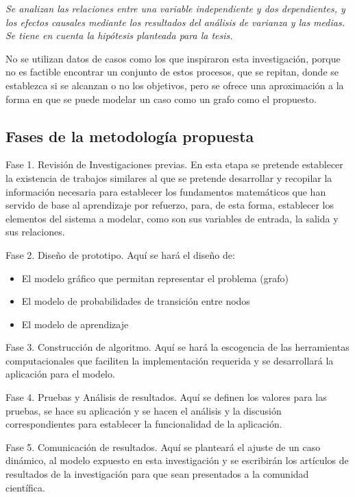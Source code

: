 \textit{Se analizan las relaciones entre una variable independiente y dos dependientes, y los efectos causales mediante los resultados del análisis de varianza y las medias. Se tiene en cuenta la hipótesis planteada para la tesis.}

No se utilizan datos de casos como los que inspiraron esta investigación, porque no es factible encontrar un conjunto de estos procesos, que se repitan, donde se establezca si se alcanzan o no los objetivos, pero se ofrece una aproximación a la forma en que se puede modelar un caso como un grafo como el propuesto.

\subsection{Fases de la metodología propuesta}

Fase 1. Revisión de Investigaciones previas. En esta etapa se pretende establecer la existencia de trabajos similares al que se pretende desarrollar y recopilar la información necesaria para establecer los fundamentos matemáticos que han servido de base al aprendizaje por refuerzo, para, de esta forma, establecer los elementos del sistema a modelar, como son sus variables de entrada, la salida y sus relaciones.

Fase 2.  Diseño de prototipo. Aquí se hará el diseño de:
\begin{itemize}
\item El modelo gráfico que permitan representar el problema (grafo)
\item El modelo de probabilidades de transición entre nodos
\item El modelo de aprendizaje
\end{itemize}

Fase 3. Construcción de algoritmo. 
Aquí se hará la escogencia de las herramientas computacionales que faciliten la implementación requerida y se desarrollará la aplicación para el modelo.

Fase 4. Pruebas y Análisis de resultados. Aquí se definen los valores para las pruebas, se hace su aplicación y se hacen el análisis y la discusión correspondientes para establecer la funcionalidad de la aplicación.

Fase 5. Comunicación de resultados. Aquí se planteará el ajuste de un caso dinámico, al modelo expuesto en esta investigación y se escribirán los artículos de resultados de la investigación para que sean presentados a la comunidad científica.


